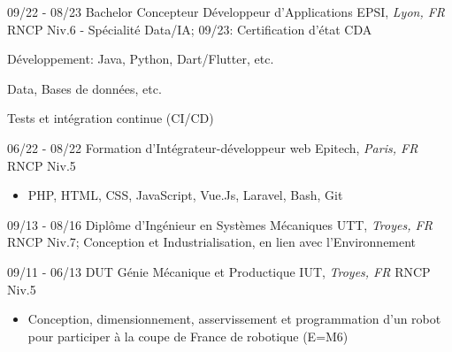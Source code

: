 \documentclass[]{friggeri-cv}
\begin{document}
\begin{entrylist}
  \entry
    {09/22 - 08/23}
    {Bachelor Concepteur Développeur d'Applications}
    {EPSI, \textit{Lyon, FR}}
    {RNCP Niv.6 - Spécialité Data/IA; \hspace{7mm} 09/23: Certification d'état CDA}
\end{entrylist}
\vspace*{-0.65cm}
\begin{itemize}
\setlength{\itemsep}{1pt}
\setlength{\parskip}{0pt}
\setlength{\parsep}{0pt}
\begin{multicols}{2}
\item Développement: \newline Java, Python, Dart/Flutter, etc.
\columnbreak
\item Data, Bases de données, etc.
\item Tests et intégration continue (CI/CD)
\end{multicols}
\end{itemize}
\begin{entrylist}
  \entry
    {06/22 - 08/22}
    {Formation d'Intégrateur-développeur web}
    {Epitech, \textit{Paris, FR}}
    {RNCP Niv.5}
\end{entrylist}

\vspace*{-0.35cm}
\begin{itemize}
\setlength{\itemsep}{1pt}
\setlength{\parskip}{0pt}
\setlength{\parsep}{0pt}

\item PHP, HTML, CSS, JavaScript, Vue.Js, Laravel, Bash, Git
\end{itemize}
\begin{entrylist}
  \entry
    {09/13 - 08/16}
    {Diplôme d'Ingénieur en Systèmes Mécaniques}
    {UTT, \textit{Troyes, FR}}
    {RNCP Niv.7; Conception et Industrialisation, en lien avec l’Environnement}
\end{entrylist}

\begin{entrylist}
  \entry
    {09/11 - 06/13}
    {DUT Génie Mécanique et Productique}
    {IUT, \textit{Troyes, FR}}
    {RNCP Niv.5}
\end{entrylist}
\vspace*{-0.4cm}
\begin{itemize}
\setlength{\itemsep}{1pt}
\setlength{\parskip}{0pt}
\setlength{\parsep}{0pt}
\item Conception, dimensionnement, asservissement et programmation d’un robot pour participer à la coupe de France de robotique (E=M6)
\end{itemize}
\end{document}
